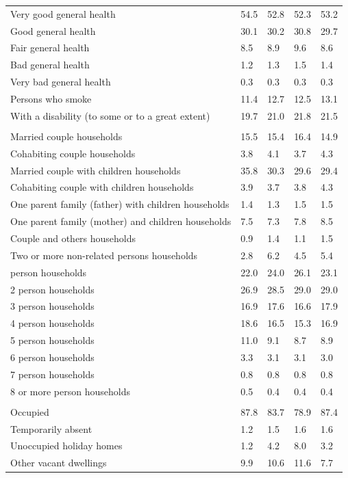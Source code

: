 \documentclass{article}
\begin{document}
\begin{table}[h]
\begin{tabular}{KTTTT}
    \hline
Very good general health & 54.5& 52.8&52.3& 53.2\\
Good general health & 30.1& 30.2& 30.8& 29.7\\
Fair general health & 8.5& 8.9&9.6& 8.6\\
Bad general health & 1.2& 1.3&1.5& 1.4\\
Very bad general health & 0.3& 0.3&0.3& 0.3\\
    \hline
Persons who smoke & 11.4& 12.7&12.5& 13.1\\
    \hline
With a disability (to some or to a great extent) & 19.7& 21.0&21.8& 21.5\\
\hline
    \\ 
    \hline
Married couple households & 15.5& 15.4& 16.4& 14.9\\
Cohabiting couple households & 3.8& 4.1& 3.7& 4.3\\
Married couple with children households & 35.8& 30.3& 29.6& 29.4\\
Cohabiting couple with children households & 3.9& 3.7& 3.8& 4.3\\
One parent family (father) with  children households & 1.4& 1.3& 1.5& 1.5\\
One parent family (mother) and children households & 7.5& 7.3& 7.8& 8.5\\
Couple and others households  & 0.9& 1.4& 1.1& 1.5\\
Two or more non-related persons households & 2.8& 6.2& 4.5& 5.4\\
     person households & 22.0& 24.0& 26.1& 23.1\\
2 person households & 26.9& 28.5& 29.0& 29.0\\
3 person households & 16.9& 17.6& 16.6& 17.9\\
4 person households & 18.6& 16.5& 15.3& 16.9\\
5 person households & 11.0&  9.1&  8.7&  8.9\\
6 person households & 3.3& 3.1& 3.1& 3.0\\
7 person households & 0.8& 0.8& 0.8& 0.8\\
8 or more person households & 0.5& 0.4& 0.4& 0.4\\
\hline
    \\ 
    \hline
Occupied & 87.8& 83.7& 78.9& 87.4\\
Temporarily absent & 1.2& 1.5& 1.6& 1.6\\
Unoccupied holiday homes & 1.2& 4.2& 8.0& 3.2\\
Other vacant dwellings &  9.9& 10.6& 11.6&  7.7\\
\hline
\end{tabular}
\end{table}
\end{document}
